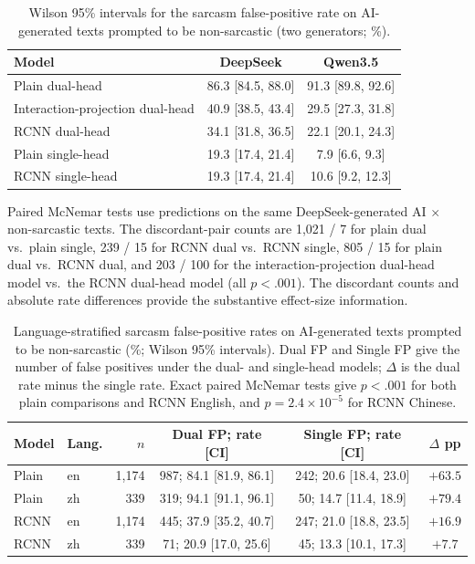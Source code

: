 \begin{table}[h]
  \centering
  \footnotesize
  \setlength{\tabcolsep}{1.5pt}
  \begin{tabular}{@{}>{\raggedright\arraybackslash}p{2.25cm}cc@{}}
    \toprule
    \textbf{Model} & \textbf{DeepSeek} & \textbf{Qwen3.5} \\
    \midrule
    Plain dual-head & 86.3 [84.5, 88.0] & 91.3 [89.8, 92.6] \\
    Interaction-projection dual-head & 40.9 [38.5, 43.4] & 29.5 [27.3, 31.8] \\
    RCNN dual-head & 34.1 [31.8, 36.5] & 22.1 [20.1, 24.3] \\
    Plain single-head & 19.3 [17.4, 21.4] & 7.9 [6.6, 9.3] \\
    RCNN single-head & 19.3 [17.4, 21.4] & 10.6 [9.2, 12.3] \\
    \bottomrule
  \end{tabular}
  \caption{Wilson 95\% intervals for the sarcasm false-positive rate on AI-generated texts prompted to be non-sarcastic (two generators; \%).}
  \label{tab:wilson}
\end{table}

Paired McNemar tests use predictions on the same DeepSeek-generated AI $\times$ non-sarcastic texts. The discordant-pair counts are 1{,}021 / 7 for plain dual vs.\ plain single, 239 / 15 for RCNN dual vs.\ RCNN single, 805 / 15 for plain dual vs.\ RCNN dual, and 203 / 100 for the interaction-projection dual-head model vs.\ the RCNN dual-head model (all $p < .001$). The discordant counts and absolute rate differences provide the substantive effect-size information.

\begin{table}[t]
  \centering
  \small
  \setlength{\tabcolsep}{6pt}
  \begin{tabular}{@{}llrccc@{}}
    \toprule
    \textbf{Model} & \textbf{Lang.} & \textbf{$n$} & \textbf{Dual FP; rate [CI]} & \textbf{Single FP; rate [CI]} & \textbf{$\Delta$ pp} \\
    \midrule
    Plain & en & 1{,}174 & 987; 84.1 [81.9, 86.1] & 242; 20.6 [18.4, 23.0] & $+63.5$ \\
    Plain & zh & 339 & 319; 94.1 [91.1, 96.1] & 50; 14.7 [11.4, 18.9] & $+79.4$ \\
    RCNN & en & 1{,}174 & 445; 37.9 [35.2, 40.7] & 247; 21.0 [18.8, 23.5] & $+16.9$ \\
    RCNN & zh & 339 & 71; 20.9 [17.0, 25.6] & 45; 13.3 [10.1, 17.3] & $+7.7$ \\
    \bottomrule
  \end{tabular}
  \caption{Language-stratified sarcasm false-positive rates on AI-generated texts prompted to be non-sarcastic (\%; Wilson 95\% intervals). Dual FP and Single FP give the number of false positives under the dual- and single-head models; $\Delta$ is the dual rate minus the single rate. Exact paired McNemar tests give $p<.001$ for both plain comparisons and RCNN English, and $p=2.4\times10^{-5}$ for RCNN Chinese.}
  \label{tab:lang-quadrant}
\end{table}

